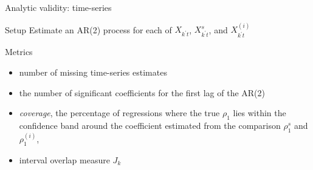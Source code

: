\begin{frame}{Analytic validity: time-series}
\begin{block}{Setup}
Estimate an AR(2) process for each of 
$X_{k^\prime t}$, $X_{k^\prime t}^{s}$, and $X_{k^\prime t}^{(i)}$
\end{block}
\begin{block}{Metrics}
\begin{itemize}
\item  number of missing time-series estimates %
\item the number of significant coefficients for the first lag of the AR(2)
\item \emph{coverage}, the 
percentage of regressions where the true $\rho_1$ lies within the confidence band around the 
coefficient estimated from the comparison $\rho_1^{s}$ and $\rho_1^{(i)}$, 
\item interval overlap measure $J_k$ \cite{tas2006}
\end{itemize}
\end{block}
\end{frame}


